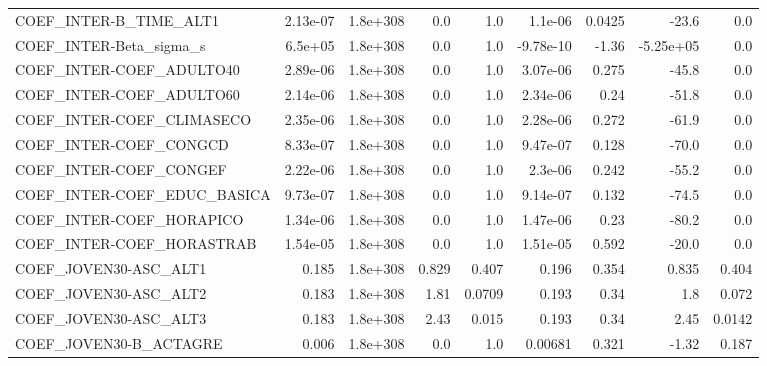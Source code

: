 \begin{tabular}{lrrrrrrrr}
COEF\_INTER-B\_TIME\_ALT1            &    2.13e-07 &     1.8e+308 &     0.0 &      1.0 &    1.1e-06 &      0.0425 &        -23.6 &           0.0 \\
COEF\_INTER-Beta\_sigma\_s           &     6.5e+05 &     1.8e+308 &     0.0 &      1.0 &  -9.78e-10 &       -1.36 &    -5.25e+05 &           0.0 \\
COEF\_INTER-COEF\_ADULTO40          &    2.89e-06 &     1.8e+308 &     0.0 &      1.0 &   3.07e-06 &       0.275 &        -45.8 &           0.0 \\
COEF\_INTER-COEF\_ADULTO60          &    2.14e-06 &     1.8e+308 &     0.0 &      1.0 &   2.34e-06 &        0.24 &        -51.8 &           0.0 \\
COEF\_INTER-COEF\_CLIMASECO         &    2.35e-06 &     1.8e+308 &     0.0 &      1.0 &   2.28e-06 &       0.272 &        -61.9 &           0.0 \\
COEF\_INTER-COEF\_CONGCD            &    8.33e-07 &     1.8e+308 &     0.0 &      1.0 &   9.47e-07 &       0.128 &        -70.0 &           0.0 \\
COEF\_INTER-COEF\_CONGEF            &    2.22e-06 &     1.8e+308 &     0.0 &      1.0 &    2.3e-06 &       0.242 &        -55.2 &           0.0 \\
COEF\_INTER-COEF\_EDUC\_BASICA       &    9.73e-07 &     1.8e+308 &     0.0 &      1.0 &   9.14e-07 &       0.132 &        -74.5 &           0.0 \\
COEF\_INTER-COEF\_HORAPICO          &    1.34e-06 &     1.8e+308 &     0.0 &      1.0 &   1.47e-06 &        0.23 &        -80.2 &           0.0 \\
COEF\_INTER-COEF\_HORASTRAB         &    1.54e-05 &     1.8e+308 &     0.0 &      1.0 &   1.51e-05 &       0.592 &        -20.0 &           0.0 \\
COEF\_JOVEN30-ASC\_ALT1             &       0.185 &     1.8e+308 &   0.829 &    0.407 &      0.196 &       0.354 &        0.835 &         0.404 \\
COEF\_JOVEN30-ASC\_ALT2             &       0.183 &     1.8e+308 &    1.81 &   0.0709 &      0.193 &        0.34 &          1.8 &         0.072 \\
COEF\_JOVEN30-ASC\_ALT3             &       0.183 &     1.8e+308 &    2.43 &    0.015 &      0.193 &        0.34 &         2.45 &        0.0142 \\
COEF\_JOVEN30-B\_ACTAGRE            &       0.006 &     1.8e+308 &     0.0 &      1.0 &    0.00681 &       0.321 &        -1.32 &         0.187 \\

\end{tabular}
